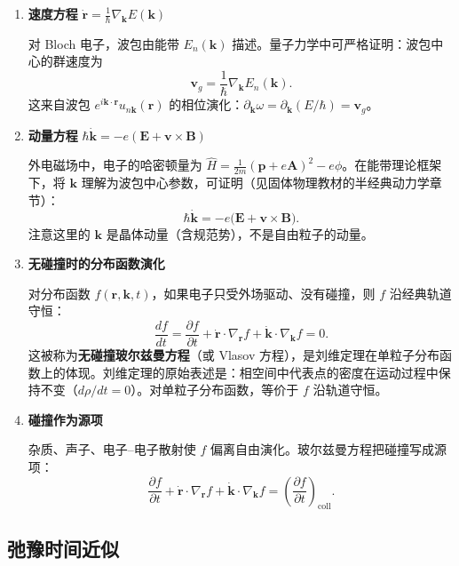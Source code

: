 \begin{derivationbox}
\begin{enumerate}
    \item \textbf{速度方程} $\dot{\bm{r}} = \frac{1}{\hbar}\nabla_{\!\bm{k}}E(\bm{k})$
    
    对 Bloch 电子，波包由能带 $E_n(\bm{k})$ 描述。量子力学中可严格证明：波包中心的群速度为
    \[
    \bm{v}_g = \frac{1}{\hbar}\nabla_{\!\bm{k}}E_n(\bm{k}).
    \]
    这来自波包 $e^{i\bm{k}\cdot\bm{r}}u_{n\bm{k}}(\bm{r})$ 的相位演化：$\partial_{\bm{k}}\omega = \partial_{\bm{k}}(E/\hbar) = \bm{v}_g$。

    \item \textbf{动量方程} $\hbar\dot{\bm{k}} = -e(\bm{E} + \bm{v} \times \bm{B})$
    
    外电磁场中，电子的哈密顿量为 $\hat{H} = \frac{1}{2m}(\bm{p} + e\bm{A})^2 - e\phi$。在能带理论框架下，将 $\bm{k}$ 理解为波包中心参数，可证明（见固体物理教材的半经典动力学章节）：
    \[
    \hbar\dot{\bm{k}} = -e\bigl(\bm{E} + \bm{v} \times \bm{B}\bigr).
    \]
    注意这里的 $\bm{k}$ 是晶体动量（含规范势），不是自由粒子的动量。

    \item \textbf{无碰撞时的分布函数演化}
    
    对分布函数 $f(\bm{r},\bm{k},t)$，如果电子只受外场驱动、没有碰撞，则 $f$ 沿经典轨道守恒：
    \[
    \frac{df}{dt} = \frac{\partial f}{\partial t} + \dot{\bm{r}} \cdot \nabla_{\!\bm{r}}f + \dot{\bm{k}} \cdot \nabla_{\!\bm{k}}f = 0.
    \]
    这被称为\textbf{无碰撞玻尔兹曼方程}（或 Vlasov 方程），是刘维定理在单粒子分布函数上的体现。刘维定理的原始表述是：相空间中代表点的密度在运动过程中保持不变（$d\rho/dt = 0$）。对单粒子分布函数，等价于 $f$ 沿轨道守恒。

    \item \textbf{碰撞作为源项}
    
    杂质、声子、电子--电子散射使 $f$ 偏离自由演化。玻尔兹曼方程把碰撞写成源项：
    \[
    \frac{\partial f}{\partial t} + \dot{\bm{r}} \cdot \nabla_{\!\bm{r}}f + \dot{\bm{k}} \cdot \nabla_{\!\bm{k}}f = \left(\frac{\partial f}{\partial t}\right)_{\!\text{coll}}.
    \]
\end{enumerate}
\end{derivationbox}

\subsection{弛豫时间近似}

